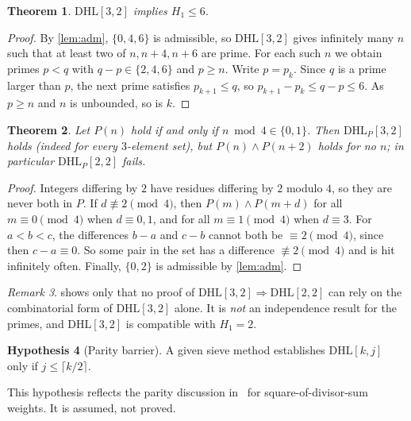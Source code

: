 \documentclass[11pt]{amsart}
\theoremstyle{plain}
\newtheorem{theorem}{Theorem}[section]
\theoremstyle{definition}
\newtheorem{hypothesis}[theorem]{Hypothesis}
\theoremstyle{remark}
\newtheorem{remark}[theorem]{Remark}
\newcommand{\DHL}{\mathrm{DHL}}
\begin{document}
\begin{theorem}\label{thm:main}
$\DHL[3,2]$ implies $H_1\le6$.
\end{theorem}
\begin{proof}
By \cref{lem:adm}, $\{0,4,6\}$ is admissible, so $\DHL[3,2]$ gives infinitely many $n$ such that at least two of $n,n+4,n+6$ are prime. For each such $n$ we obtain primes $p<q$ with $q-p\in\{2,4,6\}$ and $p\ge n$. Write $p=p_k$. Since $q$ is a prime larger than $p$, the next prime satisfies $p_{k+1}\le q$, so $p_{k+1}-p_k\le q-p\le6$. As $p\ge n$ and $n$ is unbounded, so is $k$.
\end{proof}

\begin{theorem}\label{thm:model}
Let $P(n)$ hold if and only if $n\bmod4\in\{0,1\}$. Then $\DHL_P[3,2]$ holds (indeed for every $3$-element set), but $P(n)\wedge P(n+2)$ holds for no $n$; in particular $\DHL_P[2,2]$ fails.
\end{theorem}
\begin{proof}
Integers differing by $2$ have residues differing by $2$ modulo $4$, so they are never both in $P$. If $d\not\equiv2\pmod4$, then $P(m)\wedge P(m+d)$ for all $m\equiv0\pmod 4$ when $d\equiv0,1$, and for all $m\equiv1\pmod4$ when $d\equiv3$. For $a<b<c$, the differences $b-a$ and $c-b$ cannot both be $\equiv2\pmod4$, since then $c-a\equiv0$. So some pair in the set has a difference $\not\equiv2\pmod 4$ and is hit infinitely often. Finally, $\{0,2\}$ is admissible by \cref{lem:adm}.
\end{proof}

\begin{remark}\label{rem:model}
 shows only that no proof of $\DHL[3,2]\Rightarrow\DHL[2,2]$ can rely on the combinatorial form of $\DHL[3,2]$ alone. It is \emph{not} an independence result for the primes, and $\DHL[3,2]$ is compatible with $H_1=2$.
\end{remark}

\begin{hypothesis}[Parity barrier]\label{hyp:parity}
A given sieve method establishes $\DHL[k,j]$ only if $j\le\lceil k/2\rceil$.
\end{hypothesis}

This hypothesis reflects the parity discussion in~\cite{Polymath} for square-of-divisor-sum weights. It is assumed, not proved.
\end{document}

